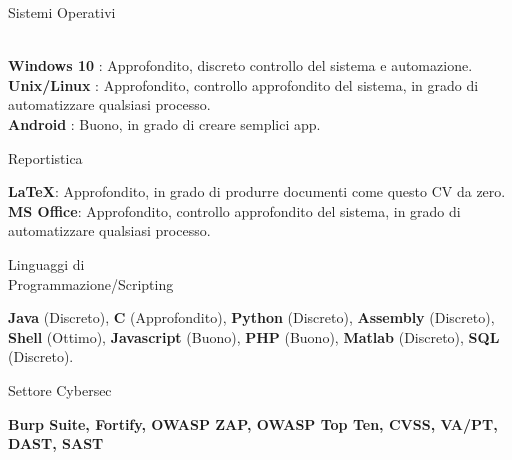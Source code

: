 \begin{minipage}{.3\textwidth}
	\flushright Sistemi Operativi \\ \faWindows \ \faLinux \ \faApple \ \faAndroid
\end{minipage}
\hfill
\begin{minipage}{.65\textwidth}
	\vfill
	\textbf{Windows 10} \faWindows : Approfondito, discreto controllo del sistema e automazione. 
	\\
	\textbf{Unix/Linux} \faLinux : Approfondito, controllo approfondito del sistema, in grado di automatizzare qualsiasi processo.
	\\
	\textbf{Android} \faAndroid : Buono, in grado di creare semplici app.
	\vfill
\end{minipage}

\bigskip

\begin{minipage}{.3\textwidth}
	\flushright Reportistica \faBook 
\end{minipage}
\hfill
\begin{minipage}{.65\textwidth}
	\vfill
	\textbf{\LaTeX}: Approfondito, in grado di produrre documenti come questo CV da zero. 
	\\
	\textbf{MS Office}: Approfondito, controllo approfondito del sistema, in grado di automatizzare qualsiasi processo.
	\vfill
\end{minipage}

\bigskip

\begin{minipage}{.3\textwidth}
	\flushright Linguaggi di \\ Programmazione/Scripting
\end{minipage}
\hfill
\begin{minipage}{.65\textwidth}
	\vfill
	\textbf{Java} (Discreto), \textbf{C} (Approfondito), \textbf{Python} (Discreto), \textbf{Assembly} (Discreto), \textbf{Shell} (Ottimo), \textbf{Javascript} (Buono), \textbf{PHP} (Buono), \textbf{Matlab} (Discreto), \textbf{SQL} (Discreto). 
	\vfill
\end{minipage}

\bigskip

\begin{minipage}{.3\textwidth}
	\flushright Settore Cybersec
\end{minipage}
\hfill
\begin{minipage}{.64\textwidth}
	\vfill
	\textbf{Burp Suite, Fortify, OWASP ZAP, OWASP Top Ten, CVSS, VA/PT, DAST, SAST} 
	\vfill
\end{minipage}